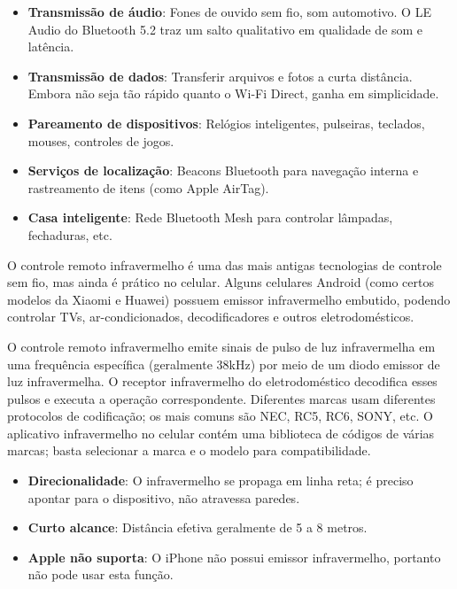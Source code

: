 \begin{itemize}
  \item \textbf{Transmissão de áudio}: Fones de ouvido sem fio, som automotivo. O LE Audio do Bluetooth 5.2 traz um salto qualitativo em qualidade de som e latência.
  \item \textbf{Transmissão de dados}: Transferir arquivos e fotos a curta distância. Embora não seja tão rápido quanto o Wi-Fi Direct, ganha em simplicidade.
  \item \textbf{Pareamento de dispositivos}: Relógios inteligentes, pulseiras, teclados, mouses, controles de jogos.
  \item \textbf{Serviços de localização}: Beacons Bluetooth para navegação interna e rastreamento de itens (como Apple AirTag).
  \item \textbf{Casa inteligente}: Rede Bluetooth Mesh para controlar lâmpadas, fechaduras, etc.
\end{itemize}


O controle remoto infravermelho é uma das mais antigas tecnologias de controle sem fio, mas ainda é prático no celular. Alguns celulares Android (como certos modelos da Xiaomi e Huawei) possuem emissor infravermelho embutido, podendo controlar TVs, ar-condicionados, decodificadores e outros eletrodomésticos.


O controle remoto infravermelho emite sinais de pulso de luz infravermelha em uma frequência específica (geralmente 38kHz) por meio de um diodo emissor de luz infravermelha. O receptor infravermelho do eletrodoméstico decodifica esses pulsos e executa a operação correspondente. Diferentes marcas usam diferentes protocolos de codificação; os mais comuns são NEC, RC5, RC6, SONY, etc. O aplicativo infravermelho no celular contém uma biblioteca de códigos de várias marcas; basta selecionar a marca e o modelo para compatibilidade.


\begin{itemize}
  \item \textbf{Direcionalidade}: O infravermelho se propaga em linha reta; é preciso apontar para o dispositivo, não atravessa paredes.
  \item \textbf{Curto alcance}: Distância efetiva geralmente de 5 a 8 metros.
  \item \textbf{Apple não suporta}: O iPhone não possui emissor infravermelho, portanto não pode usar esta função.
\end{itemize}

